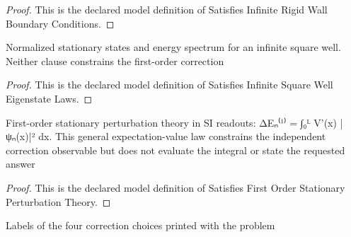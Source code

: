 \begin{proof}
  This is the declared model definition of Satisfies Infinite Rigid Wall Boundary Conditions.
\end{proof}
\begin{definition}
  \label{def:physics:phyx-mini-0545:phyxminiproblems-problemphyxmini0545-satisfiesinfinitesquarewelleigenstatelaws}
  Normalized stationary states and energy spectrum for an infinite square well. Neither clause constrains the first-order correction
\end{definition}
\begin{proof}
  This is the declared model definition of Satisfies Infinite Square Well Eigenstate Laws.
\end{proof}
\begin{definition}
  \label{def:physics:phyx-mini-0545:phyxminiproblems-problemphyxmini0545-satisfiesfirstorderstationaryperturbationtheory}
  First-order stationary perturbation theory in SI readouts: ΔEₙ⁽¹⁾ = ∫₀ᴸ V'(x) |ψₙ(x)|² dx. This general expectation-value law constrains the independent correction observable but does not evaluate the integral or state the requested answer
\end{definition}
\begin{proof}
  This is the declared model definition of Satisfies First Order Stationary Perturbation Theory.
\end{proof}
\begin{definition}
  \label{def:physics:phyx-mini-0545:phyxminiproblems-problemphyxmini0545-answerchoice}
  Labels of the four correction choices printed with the problem
\end{definition}
